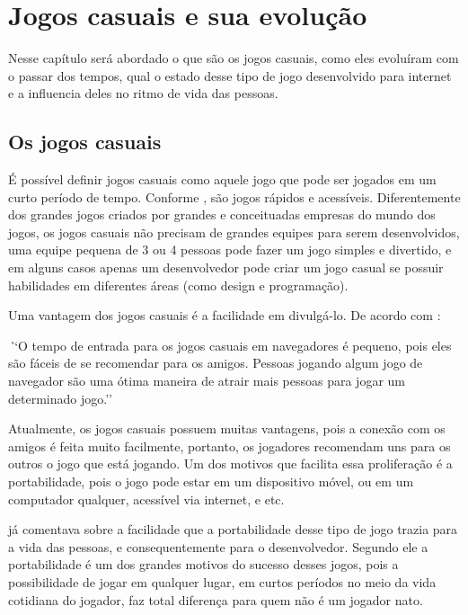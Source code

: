 \section{Jogos casuais e sua evolução}

Nesse capítulo será abordado o que são os jogos casuais, como eles
evoluíram com o passar dos tempos, qual o estado desse tipo de jogo
desenvolvido para internet e a influencia deles no ritmo de vida das
pessoas.

\subsection{Os jogos casuais}

É possível definir jogos casuais como aquele jogo que pode ser jogados em um curto período
de tempo. Conforme , são jogos rápidos e acessíveis.
Diferentemente dos grandes jogos criados por grandes e conceituadas
empresas do mundo dos jogos, os jogos casuais não precisam de grandes
equipes para serem desenvolvidos, uma equipe pequena de 3 ou 4 pessoas
pode fazer um jogo simples e divertido, e em alguns casos apenas um
desenvolvedor pode criar um jogo casual se possuir habilidades em
diferentes áreas (como design e programação).

Uma vantagem dos jogos casuais é a facilidade em divulgá-lo. De acordo com
:

\begin{singlespacing}
\begin{citacao}{4cm}{0cm}\footnotesize \emph
    ``O tempo de entrada para os jogos casuais em navegadores é pequeno,
    pois eles são fáceis de se recomendar para os amigos. Pessoas jogando
    algum jogo de navegador são uma ótima maneira de atrair mais
    pessoas para jogar um determinado jogo.''
\end{citacao}
\end{singlespacing}

Atualmente, os jogos casuais possuem muitas vantagens, pois a conexão
com os amigos é feita muito facilmente, portanto, os jogadores
recomendam uns para os outros o jogo que está jogando. Um dos motivos
que facilita essa proliferação é a portabilidade, pois o jogo pode
estar em um dispositivo móvel, ou em um computador qualquer, acessível
via internet, e etc.

\cite{ozcan2010recent} já comentava sobre a facilidade que a
portabilidade desse tipo de jogo trazia para a vida das pessoas, e
consequentemente para o desenvolvedor. Segundo ele a portabilidade é um
dos grandes motivos do sucesso desses jogos, pois a possibilidade de
jogar em qualquer lugar, em curtos períodos no meio da vida cotidiana
do jogador, faz total diferença para quem não é um jogador nato.

